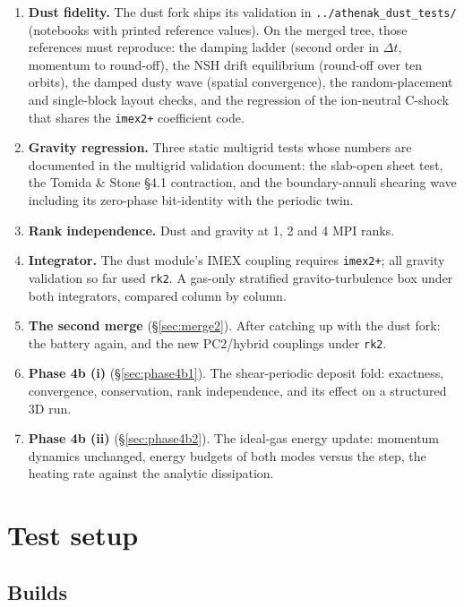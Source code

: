\documentclass[11pt]{article}
\newcommand{\code}[1]{\texttt{#1}}
\newcommand{\file}[1]{\texttt{#1}}
\begin{document}
\begin{enumerate}\itemsep2pt
  \item \textbf{Dust fidelity.} The dust fork ships its validation in
        \file{../athenak\_dust\_tests/} (notebooks with printed reference values). On the
        merged tree, those references must reproduce: the damping ladder (second order in
        $\Delta t$, momentum to round-off), the NSH drift equilibrium (round-off over ten
        orbits), the damped dusty wave (spatial convergence), the random-placement and
        single-block layout checks, and the regression of the ion-neutral C-shock that
        shares the \code{imex2+} coefficient code.
  \item \textbf{Gravity regression.} Three static multigrid tests whose numbers are
        documented in the multigrid validation document: the slab-open sheet test, the
        Tomida \& Stone \S4.1 contraction, and the boundary-annuli shearing wave
        including its zero-phase bit-identity with the periodic twin.
  \item \textbf{Rank independence.} Dust and gravity at 1, 2 and 4 MPI ranks.
  \item \textbf{Integrator.} The dust module's IMEX coupling requires \code{imex2+};
        all gravity validation so far used \code{rk2}. A gas-only stratified
        gravito-turbulence box under both integrators, compared column by column.
  \item \textbf{The second merge} (\S\ref{sec:merge2}). After catching up with the dust
        fork: the battery again, and the new PC2/hybrid couplings under \code{rk2}.
  \item \textbf{Phase 4b (i)} (\S\ref{sec:phase4b1}). The shear-periodic deposit fold:
        exactness, convergence, conservation, rank independence, and its effect on a
        structured 3D run.
  \item \textbf{Phase 4b (ii)} (\S\ref{sec:phase4b2}). The ideal-gas energy update:
        momentum dynamics unchanged, energy budgets of both modes versus the step, the
        heating rate against the analytic dissipation.
\end{enumerate}

\section{Test setup}
\label{sec:setup}

\subsection{Builds}
\end{document}
